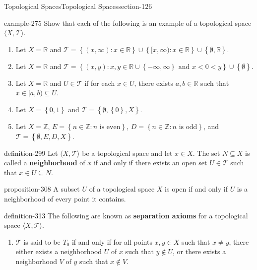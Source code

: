 \documentclass[oneside,10pt,]{article}
\newcommand{\terminology}[1]{\textbf{#1}}
\newcommand{\tuple}[1]{\langle #1 \rangle}
\newcommand{\mb}{\mathbb}
\newcommand{\mc}{\mathcal}
\newcommand{\setBuilder}[2]{\left\{#1:#2\right\}}
\newcommand{\setList}[1]{\left\{#1\right\}}
\newcommand{\lt}{<}
\begin{document}
\begin{sectionptx}{Topological Spaces}{}{Topological Spaces}{}{}{section-126}
\begin{example}{}{example-275}%
\hypertarget{p-276}{}%
Show that each of the following is an example of a topological space \(\tuple{X,\mc T}\).%
\leavevmode%
\begin{enumerate}
\item\hypertarget{li-279}{}Let \(X=\mb R\) and \(\mc T=\setBuilder{(x,\infty)}{x\in\mb R}
\cup\setBuilder{[x,\infty)}{x\in\mb R}\cup\setList{\emptyset,\mb R}\).%
\item\hypertarget{li-282}{}Let \(X=\mb R\) and \(\mc T=\setBuilder{(x,y)}{
x,y\in\mb R\cup\setList{-\infty,\infty} \text{ and }x\lt 0\lt y
}\cup\setList{\emptyset}\).%
\item\hypertarget{li-285}{}Let \(X=\mb R\) and \(U\in\mc T\) if for each \(x\in U\), there exists \(a,b\in\mb R\) such that \(x\in[a,b)\subseteq U\).%
\item\hypertarget{li-291}{}Let \(X=\setList{0,1}\) and \(\mc T=\setList{\emptyset,\setList{0},X}\).%
\item\hypertarget{li-294}{}Let \(X=\mb Z\), \(E=\setBuilder{n\in\mb Z}{n\text{ is even}}\), \(D=\setBuilder{n\in\mb Z}{n\text{ is odd}}\), and \(\mc T=\setList{\emptyset,E,D,X}\).%
\end{enumerate}
\end{example}
\begin{definition}{}{definition-299}%
\hypertarget{p-300}{}%
Let \(\tuple{X,\mc T}\) be a topological space and let \(x\in X\). The set \(N\subseteq X\) is called a \terminology{neighborhood} of \(x\) if and only if there exists an open set \(U\in\mc T\) such that \(x\in U\subseteq N\).%
\end{definition}
\begin{proposition}{}{}{proposition-308}%
\hypertarget{p-309}{}%
A subset \(U\) of a topological space \(X\) is open if and only if \(U\) is a neighborhood of every point it contains.%
\end{proposition}
\begin{definition}{}{definition-313}%
\hypertarget{p-314}{}%
The following are known as \terminology{separation axioms} for a topological space \(\tuple{X,\mc T}\).%
\leavevmode%
\begin{enumerate}
\item\hypertarget{li-318}{}\(\mc T\) is said to be \terminology{\(T_0\)} if and only if for all points \(x,y\in X\) such that \(x\not=y\), there either exists a neighborhood \(U\) of \(x\) such that \(y\not\in U\), or there exists a neighborhood \(V\) of \(y\) such that \(x\not\in V\).%

\end{enumerate}
\end{definition}
\end{sectionptx}
\end{document}
